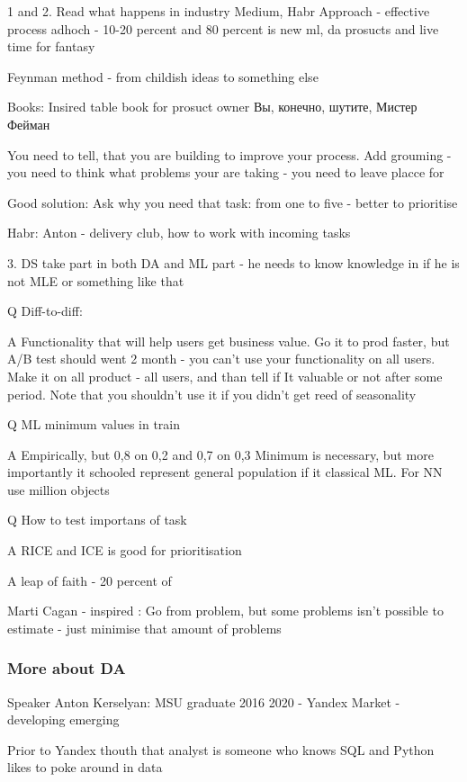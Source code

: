 \documentclass[12pt, a4paper, oneside]{article}
\begin{document}
1 and 2. Read what happens in industry Medium, Habr
Approach - effective process adhoch - 10-20 percent and 80 percent is new ml, da prosucts and live time for fantasy 

Feynman method - from childish ideas to something else 

Books: Insired table book for prosuct owner
Вы, конечно, шутите, Мистер Фейман

You need to tell, that you are building to improve your process. Add grouming - you need to think what problems your are taking - you need to leave placce for 

Good solution: Ask why you need that task: from one to five - better to prioritise 

Habr: Anton - delivery club, how to work with incoming tasks 

3. DS take part in both DA and ML part - he needs to know knowledge in  if he is not MLE or something like that  




Q Diff-to-diff:


A
Functionality that will help users get business value. 
Go it to prod faster, but A/B test should went 2 month - you can't use your functionality on all users. 
Make it on all product - all users, and than tell if It valuable or not after  
some period. Note that you shouldn't use it if you didn't get reed of seasonality 

Q ML minimum values in train 

A Empirically, but 0,8 on 0,2 and 0,7 on 0,3
Minimum is necessary, but more importantly it schooled represent general population if it classical ML. 
For NN use million objects

Q How to test importans of task 

A
RICE and ICE is good for prioritisation 

A leap of faith - 20 percent of 

Marti Cagan - inspired : Go from problem, but some problems isn't possible to estimate - just minimise that amount of problems 

\subsubsection{More about DA}


Speaker Anton Kerselyan:
MSU graduate 2016
2020 - Yandex Market - developing emerging 


Prior to Yandex thouth that analyst is someone who knows SQL and Python likes to poke around in data
\end{document}

